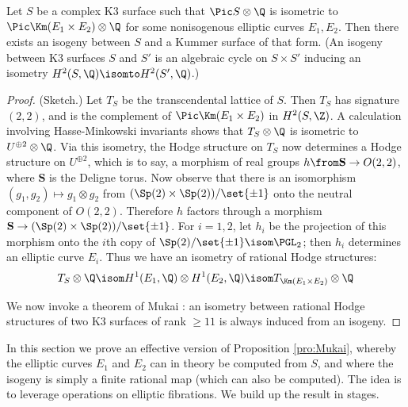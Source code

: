 \documentclass{article}
\newcommand{\adam}[1]{\textcolor{blue}{#1}}
\begin{document}
\begin{prop} \label{pro:Mukai} Let $S$ be a complex K3 surface such that $\Pic S\otimes \Q$ is isometric to $\Pic \Km(E_1\times E_2)\otimes \Q$ for some nonisogenous elliptic curves $E_1,E_2$.  Then there exists an isogeny between $S$ and a Kummer surface of that form.  (An isogeny between K3 surfaces $S$ and $S'$ is an algebraic cycle on $S\times S'$ inducing an isometry $H^2(S,\Q)\isomto H^2(S',\Q)$.) 
\end{prop}

\begin{proof} (Sketch.)  Let $T_S$ be the transcendental lattice of $S$.  Then $T_S$ has signature $(2,2)$, and is the complement of $\Pic \Km(E_1\times E_2)$ in $H^2(S,\Z)$.  A calculation involving Hasse-Minkowski invariants shows that $T_S\otimes \Q$ is isometric to $U^{\oplus 2} \otimes \Q$.   Via this isometry, the Hodge structure on $T_S$ now determines a Hodge structure on $U^{\oplus 2}$, which is to say, a morphism of real groups $h\from \mathbf{S}\to O(2,2)$, where $\mathbf{S}$ is the Deligne torus.  Now observe that there is an isomorphism $(g_1,g_2)\mapsto g_1\otimes g_2$ from $(\Sp(2)\times \Sp(2))/\set{\pm 1}$ onto the neutral component of $O(2,2)$.  Therefore $h$ factors through a morphism $\mathbf{S}\to (\Sp(2)\times \Sp(2))/\set{\pm 1}$.  For $i=1,2$, let $h_i$ be the projection of this morphism onto the $i$th copy of $\Sp(2)/\set{\pm 1}\isom \PGL_2$;  then $h_i$ determines an elliptic curve $E_i$.   Thus we have an isometry of rational Hodge structures:
\[ T_S\otimes\Q\isom H^1(E_1,\Q)\otimes H^1(E_2,\Q) \isom T_{\Km(E_1\times E_2)}\otimes \Q \]

We now invoke a theorem of Mukai \cite[Corollary 1.10]{Mukai}:  an isometry between rational Hodge structures of two K3 surfaces of rank $\geq 11$ is always induced from an isogeny.  
\end{proof}

In this section we prove an effective version of Proposition \ref{pro:Mukai}, whereby the elliptic curves $E_1$ and $E_2$ can in theory be computed from $S$, and where the isogeny is simply a finite rational map (which can also be computed).   The idea is to leverage operations on elliptic fibrations.  We build up the result in stages.


  
\end{document}
